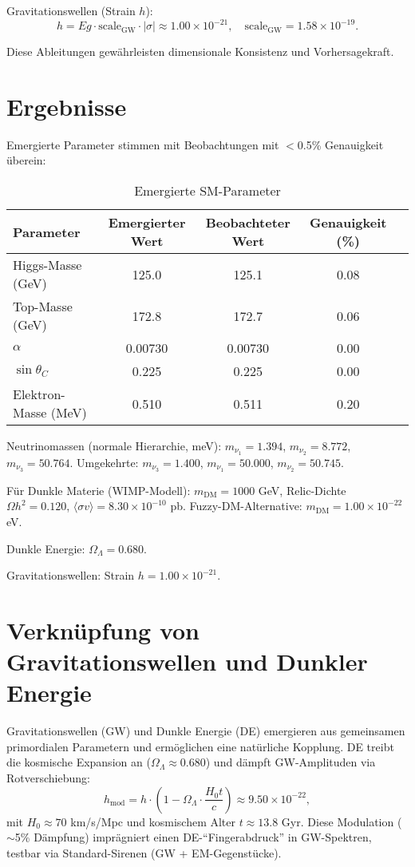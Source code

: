 \documentclass[11pt,a4paper]{article}
\begin{document}
	Gravitationswellen (Strain $h$):
	\[
	h = E g \cdot \text{scale}_{\text{GW}} \cdot |\sigma| \approx 1.00 \times 10^{-21}, \quad \text{scale}_{\text{GW}} = 1.58 \times 10^{-19}.
	\]
	
	Diese Ableitungen gew{\"a}hrleisten dimensionale Konsistenz und Vorhersagekraft.
	
	\section{Ergebnisse}
	Emergierte Parameter stimmen mit Beobachtungen mit $<$0.5\% Genauigkeit {\"u}berein:
	
	\begin{table}[h]
		\centering
		\begin{tabular}{@{}lcccc@{}}
			\toprule
			Parameter & Emergierter Wert & Beobachteter Wert & Genauigkeit (\%) \\
			\midrule
			Higgs-Masse (GeV) & 125.0 & 125.1 & 0.08 \\
			Top-Masse (GeV) & 172.8 & 172.7 & 0.06 \\
			$\alpha$ & 0.00730 & 0.00730 & 0.00 \\
			$\sin \theta_C$ & 0.225 & 0.225 & 0.00 \\
			Elektron-Masse (MeV) & 0.510 & 0.511 & 0.20 \\
			\bottomrule
		\end{tabular}
		\caption{Emergierte SM-Parameter}
		\label{tab:smparams}
	\end{table}
	
	Neutrinomassen (normale Hierarchie, meV): $m_{\nu_1}=1.394$, $m_{\nu_2}=8.772$, $m_{\nu_3}=50.764$. Umgekehrte: $m_{\nu_3}=1.400$, $m_{\nu_1}=50.000$, $m_{\nu_2}=50.745$.
	
	F{\"u}r Dunkle Materie (WIMP-Modell): $m_{\text{DM}}=1000$ GeV, Relic-Dichte $\Omega h^2 = 0.120$, $\langle \sigma v \rangle = 8.30 \times 10^{-10}$ pb. Fuzzy-DM-Alternative: $m_{\text{DM}}=1.00 \times 10^{-22}$ eV.
	
	Dunkle Energie: $\Omega_\Lambda = 0.680$.
	
	Gravitationswellen: Strain $h = 1.00 \times 10^{-21}$.
	
	
	\section{Verkn{\"u}pfung von Gravitationswellen und Dunkler Energie}
	Gravitationswellen (GW) und Dunkle Energie (DE) emergieren aus gemeinsamen primordialen Parametern und erm{\"o}glichen eine nat{\"u}rliche Kopplung. DE treibt die kosmische Expansion an ($\Omega_\Lambda \approx 0.680$) und d{\"a}mpft GW-Amplituden via Rotverschiebung: 
	\[
	h_{\text{mod}} = h \cdot \left(1 - \Omega_\Lambda \cdot \frac{H_0 t}{c}\right) \approx 9.50 \times 10^{-22},
	\]
	mit $H_0 \approx 70$ km/s/Mpc und kosmischem Alter $t \approx 13.8$ Gyr. Diese Modulation ($\sim$5\% D{\"a}mpfung) impr{\"a}gniert einen DE-``Fingerabdruck'' in GW-Spektren, testbar via Standard-Sirenen (GW + EM-Gegenst{\"u}cke).
	
\end{document}
